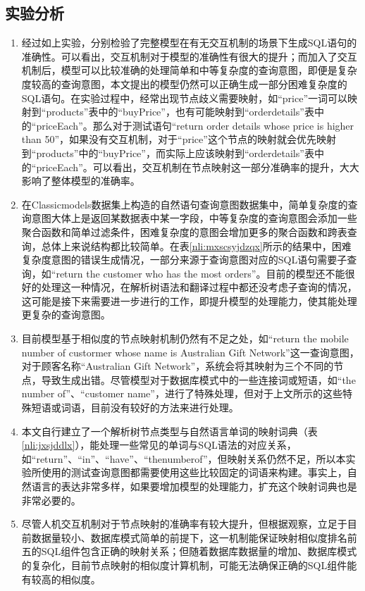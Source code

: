 \subsection{实验分析}
\begin{enumerate}
    \item 经过如上实验，分别检验了完整模型在有无交互机制的场景下生成SQL语句的准确性。可以看出，交互机制对于模型的准确性有很大的提升；而加入了交互机制后，模型可以比较准确的处理简单和中等复杂度的查询意图，即便是复杂度较高的查询意图，本文提出的模型仍然可以正确生成一部分困难复杂度的SQL语句。在实验过程中，经常出现节点歧义需要映射，如“price”一词可以映射到“products”表中的“buyPrice”，也有可能映射到“orderdetails”表中的“priceEach”。那么对于测试语句“return order details whose price is higher than 50”，如果没有交互机制，对于“price”这个节点的映射就会优先映射到“products”中的“buyPrice”，而实际上应该映射到“orderdetails”表中的“priceEach”。可以看出，交互机制在节点映射这一部分准确率的提升，大大影响了整体模型的准确率。
    \item	在Classicmodels数据集上构造的自然语句查询意图数据集中，简单复杂度的查询意图大体上是返回某数据表中某一字段，中等复杂度的查询意图会添加一些聚合函数和简单过滤条件，困难复杂度的意图会增加更多的聚合函数和跨表查询，总体上来说结构都比较简单。在表\ref{nli:mxscsyjdzqx}所示的结果中，困难复杂度意图的错误生成情况，一部分来源于查询意图对应的SQL语句需要子查询，如“return the customer who has the most orders”。目前的模型还不能很好的处理这一种情况，在解析树语法和翻译过程中都还没考虑子查询的情况，这可能是接下来需要进一步进行的工作，即提升模型的处理能力，使其能处理更复杂的查询意图。
    \item	目前模型基于相似度的节点映射机制仍然有不足之处，如“return the mobile number of custormer whose name is Australian Gift Network”这一查询意图，对于顾客名称“Australian Gift Network”，系统会将其映射为三个不同的节点，导致生成出错。尽管模型对于数据库模式中的一些连接词或短语，如“the number of”、“customer name”，进行了特殊处理，但对于上文所示的这些特殊短语或词语，目前没有较好的方法来进行处理。
    \item	本文自行建立了一个解析树节点类型与自然语言单词的映射词典（表\ref{nli:jxsjddlx}），能处理一些常见的单词与SQL语法的对应关系，如“return”、“in”、“have”、“thenumberof”，但映射关系仍然不足，所以本实验所使用的测试查询意图都需要使用这些比较固定的词语来构建。事实上，自然语言的表达非常多样，如果要增加模型的处理能力，扩充这个映射词典也是非常必要的。
    \item	尽管人机交互机制对于节点映射的准确率有较大提升，但根据观察，立足于目前数据量较小、数据库模式简单的前提下，这一机制能保证映射相似度排名前五的SQL组件包含正确的映射关系；但随着数据库数据量的增加、数据库模式的复杂化，目前节点映射的相似度计算机制，可能无法确保正确的SQL组件能有较高的相似度。
\end{enumerate}

